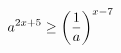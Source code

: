 \documentclass[preview]{standalone}
\begin{document}
\begin{align*}
\special{dvisvgm:raw <g id='unique000'>}a^{2x+5} \ge \left(\frac{1}{a}\right)^{x-7}\special{dvisvgm:raw </g>}
\end{align*}
\end{document}
